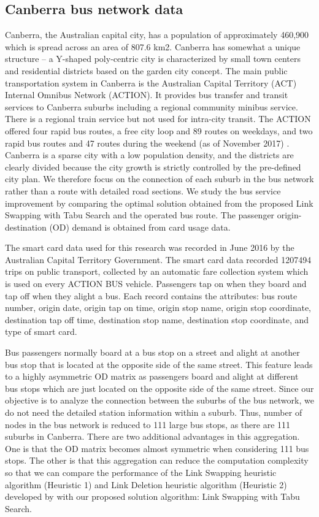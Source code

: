 \documentclass[10pt,english]{article}
\begin{document}
\subsection{Canberra bus network data}
Canberra, the Australian capital city, has a population of approximately 460,900 \citep{ABS2022} which is spread across an area of 807.6 km2. Canberra has somewhat a unique structure -- a Y-shaped poly-centric city is characterized by small town centers and residential districts based on the garden city concept. The main public transportation system in Canberra is the Australian Capital Territory (ACT) Internal Omnibus Network (ACTION). It provides bus transfer and transit services to Canberra suburbs including a regional community minibus service. There is a regional train service but not used for intra-city transit. The ACTION offered four rapid bus routes, a free city loop and 89 routes on weekdays, and two rapid bus routes and 47 routes during the weekend (as of November 2017) . Canberra is a sparse city with a low population density, and the districts are clearly divided because the city growth is strictly controlled by the pre-defined city plan. We therefore focus on the connection of each suburb in the bus network rather than a route with detailed road sections. We study the bus service improvement by comparing the optimal solution obtained from the proposed Link Swapping with Tabu Search and the operated bus route. The passenger origin-destination (OD) demand is obtained from card usage data.

The smart card data used for this research was recorded in June 2016 by the Australian Capital Territory Government. The smart card data recorded 1207494 trips on public transport, collected by an automatic fare collection system which is used on every ACTION BUS vehicle. Passengers tap on when they board and tap off when they alight a bus. Each record contains the attributes: bus route number, origin date, origin tap on time, origin stop name, origin stop coordinate, destination tap off time, destination stop name, destination stop coordinate, and type of smart card.

Bus passengers normally board at a bus stop on a street and alight at another bus stop that is located at the opposite side of the same street. This feature leads to a highly asymmetric OD matrix as passengers board and alight at different bus stops which are just located on the opposite side of the same street. Since our objective is to analyze the connection between the suburbs of the bus network, we do not need the detailed station information within a suburb. Thus, number of nodes in the bus network is reduced to 111 large bus stops, as there are 111 suburbs in Canberra. There are two additional advantages in this aggregation. One is that the OD matrix becomes almost symmetric when considering 111 bus stops. The other is that this aggregation can reduce the computation complexity so that we can compare the performance of the Link Swapping heuristic algorithm (Heuristic 1) and Link Deletion heuristic algorithm (Heuristic 2) developed by \citet{Bell2020} with our proposed solution algorithm: Link Swapping with Tabu Search.
\end{document}
